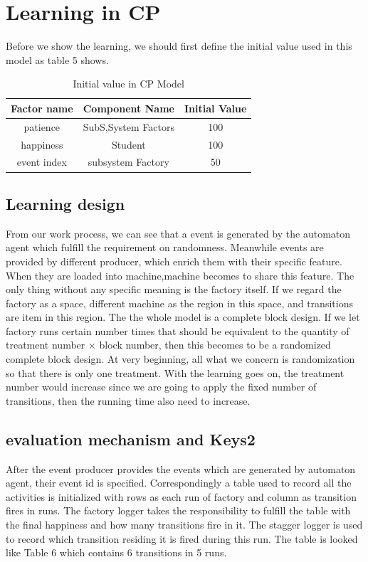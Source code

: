 \documentclass{sig-alternate}
\begin{document}
\section{ Learning in CP}
 Before we show the learning, we should first define the initial value used in this model as table 5 shows.
 
\begin{table}[h]
\centering
\caption{Initial value in CP Model }
\begin{tabular}{|c|c|c|}\hline
Factor name & Component Name & Initial Value \\
\hline
patience & SubS,System Factors & 100\\
\hline
happiness & Student &100\\
\hline
event index & subsystem Factory &50\\
\hline
\end{tabular}
\end{table}

\subsection{Learning design}
From our work process, we can see that a event is generated by the automaton agent which fulfill the requirement on randomness. Meanwhile events are provided by different producer, which enrich them with their specific feature. When they are loaded into machine,machine becomes to share this feature. The only thing without any specific meaning is the factory itself.  If we regard the factory as a space, different machine as the region in this space, and transitions are item in this region. The the whole model is a complete block design.  If we let factory runs certain number times that should be equivalent to the quantity of treatment number $\times$ block number, then this becomes to be a randomized complete block design\cite{statbok}.  At very beginning, all what we concern is randomization so that there is only one treatment.  With the learning goes on, the treatment number would increase since we are going to apply the fixed number of transitions, then the running time also need to increase. 

\subsection{evaluation mechanism and Keys2}
After the event producer provides the events which are generated by automaton agent, their event id is specified. Correspondingly a table used to record all the activities is initialized with rows as each run of factory and column as transition fires in runs.  The factory logger takes the responsibility to fulfill the table with the final happiness and how many transitions fire in it.  The stagger logger is used to record which transition residing it is fired during this run.  The table is looked like Table 6 which contains 6 transitions in 5 runs. 
\end{document}
